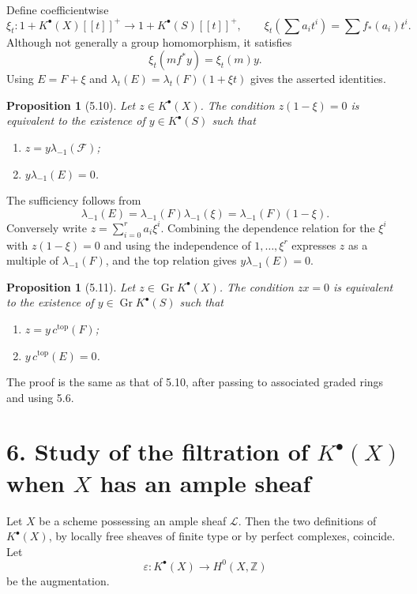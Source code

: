 \documentclass[11pt]{article}
\theoremstyle{plain}
\newtheorem{proposition}[theorem]{Proposition}
\theoremstyle{definition}
\theoremstyle{remark}
\newcommand{\ZZ}{\mathbb Z}
\DeclareMathOperator{\Gr}{Gr}
\begin{document}
Define coefficientwise
\[
\xi_t:1+K^{\bullet}(X)[[t]]^+\to 1+K^{\bullet}(S)[[t]]^+,
\qquad
\xi_t\left(\sum a_it^i\right)=\sum f_*(a_i)t^i.
\]
Although not generally a group homomorphism, it satisfies
\[
\xi_t(mf^*y)=\xi_t(m)y.
\]
Using $E=F+\xi$ and $\lambda_t(E)=\lambda_t(F)(1+
\xi t)$ gives the asserted identities.

\begin{proposition}[5.10]
Let $z\in K^{\bullet}(X)$. The condition $z(1-\xi)=0$ is equivalent to the existence of $y\in K^{\bullet}(S)$ such that
\begin{enumerate}[label=(\roman*)]
\item $z=y\lambda_{-1}(\mathcal F)$;
\item $y\lambda_{-1}(E)=0$.
\end{enumerate}
\end{proposition}

The sufficiency follows from
\[
\lambda_{-1}(E)=\lambda_{-1}(F)\lambda_{-1}(\xi)=\lambda_{-1}(F)(1-\xi).
\]
Conversely write $z=\sum_{i=0}^{r}a_i\xi^i$. Combining the dependence relation for the $\xi^i$ with $z(1-\xi)=0$ and using the independence of $1,\ldots,\xi^r$ expresses $z$ as a multiple of $\lambda_{-1}(F)$, and the top relation gives $y\lambda_{-1}(E)=0$.

\begin{proposition}[5.11]
Let $z\in\Gr K^{\bullet}(X)$. The condition $zx=0$ is equivalent to the existence of $y\in\Gr K^{\bullet}(S)$ such that
\begin{enumerate}[label=(\roman*)]
\item $z=y\,c^{\mathrm{top}}(F)$;
\item $y\,c^{\mathrm{top}}(E)=0$.
\end{enumerate}
\end{proposition}
The proof is the same as that of 5.10, after passing to associated graded rings and using 5.6.

\section*{6. Study of the filtration of $K^{\bullet}(X)$ when $X$ has an ample sheaf}

Let $X$ be a scheme possessing an ample sheaf $\mathcal L$. Then the two definitions of $K^{\bullet}(X)$, by locally free sheaves of finite type or by perfect complexes, coincide. Let
\[
\varepsilon:K^{\bullet}(X)\to H^0(X,\ZZ)
\]
be the augmentation.
\end{document}
